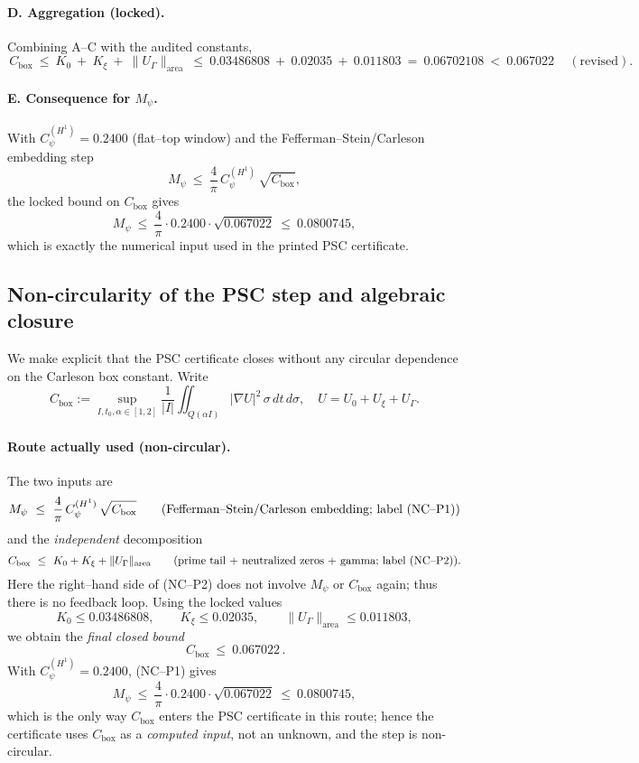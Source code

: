 \documentclass[11pt]{article}
\providecommand{\Mpsilocked}{0.0800745}%
\theoremstyle{definition}
\theoremstyle{remark}
\begin{document}
\paragraph{D. Aggregation (locked).}
Combining A–C with the audited constants,
\[
\boxed{\,C_{\mathrm{box}}\ \le\ K_0\ +\ K_\xi\ +\ \|U_\Gamma\|_{\mathrm{area}}\ \le\ 0.03486808\ +\ 0.02035\ +\ 0.011803\ =\ 0.06702108\ <\ 0.067022\,}\quad(\text{revised}).
\]

\paragraph{E. Consequence for $M_\psi$.}
With $C_\psi^{(H^1)}=0.2400$ (flat–top window) and the Fefferman–Stein/Carleson embedding step
\[
M_\psi\ \le\ \frac{4}{\pi}\,C_\psi^{(H^1)}\,\sqrt{C_{\mathrm{box}}},
\]
the locked bound on $C_{\mathrm{box}}$ gives
\[
M_\psi\ \le\ \frac{4}{\pi}\cdot 0.2400\cdot \sqrt{0.067022}\ \le\ \Mpsilocked,
\]
which is exactly the numerical input used in the printed PSC certificate.

\subsection*{Non-circularity of the PSC step and algebraic closure}

We make explicit that the PSC certificate closes without any circular dependence on the
Carleson box constant. Write
\[
C_{\mathrm{box}}
:=\sup_{I,t_0,\alpha\in[1,2]}
\frac{1}{|I|}\iint_{Q(\alpha I)} |\nabla U|^2\,\sigma\,dt\,d\sigma,
\quad
U=U_0+U_\xi+U_\Gamma.
\]

\paragraph{Route actually used (non-circular).}
The two inputs are
\[
M_\psi\ \le\ \frac{4}{\pi}\,C_\psi^{(H^1)}\,\sqrt{C_{\mathrm{box}}}
\qquad\text{(Fefferman--Stein/Carleson embedding; label {\rm (NC--P1)})}
\]
and the \emph{independent} decomposition
\[
C_{\mathrm{box}}\ \le\ K_0+K_\xi+\|U_\Gamma\|_{\mathrm{area}}
\qquad\text{(prime tail + neutralized zeros + gamma; label {\rm (NC--P2)})}.
\]
Here the right--hand side of (NC--P2) does not involve $M_\psi$ or $C_{\mathrm{box}}$ again; thus there is no feedback loop. Using the locked values
\[
K_0\le 0.03486808,\qquad K_\xi\le 0.02035,\qquad \|U_\Gamma\|_{\mathrm{area}}\le 0.011803,
\]
we obtain the \emph{final closed bound}
\[
\boxed{\,C_{\mathrm{box}}\ \le\ 0.067022\,}.
\]
With $C_\psi^{(H^1)}=0.2400$, (NC--P1) gives
\[
M_\psi\ \le\ \frac{4}{\pi}\cdot 0.2400\cdot \sqrt{0.067022}\ \le\ \Mpsilocked,
\]
which is the only way $C_{\mathrm{box}}$ enters the PSC certificate in this route; hence the certificate uses $C_{\mathrm{box}}$ as a \emph{computed input}, not an unknown, and the step is non-circular.
\end{document}
